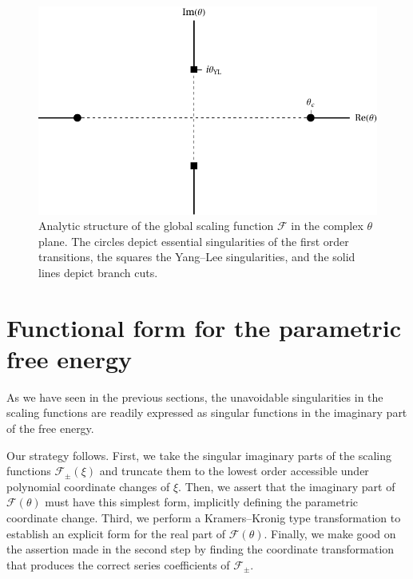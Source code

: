 \documentclass[
aps,
pre,
preprint,
longbibliography,
floatfix
]{revtex4-2}
\begin{document}
\begin{figure}
  \includegraphics{figs/F_theta_singularities.pdf}
  \caption{
    Analytic structure of the global scaling function $\mathcal F$ in the
    complex $\theta$ plane. The circles depict essential singularities of the
    first order transitions, the squares the Yang--Lee singularities, and the
    solid lines depict branch cuts.
  } \label{fig:schofield.singularities}
\end{figure}

\section{Functional form for the parametric free energy}

As we have seen in the previous sections, the unavoidable singularities in the
scaling functions are readily expressed as singular functions in the imaginary
part of the free energy.

Our strategy follows. First, we take the singular imaginary parts of the
scaling functions $\mathcal F_{\pm}(\xi)$ and truncate them to the lowest order
accessible under polynomial coordinate changes of $\xi$. Then, we assert that
the imaginary part of $\mathcal F(\theta)$ must have this simplest form,
implicitly defining the parametric coordinate change. Third, we perform a
Kramers--Kronig type transformation to establish an explicit form for the real
part of $\mathcal F(\theta)$. Finally, we make good on the assertion made in
the second step by finding the coordinate transformation that produces the
correct series coefficients of $\mathcal F_{\pm}$.
\end{document}
